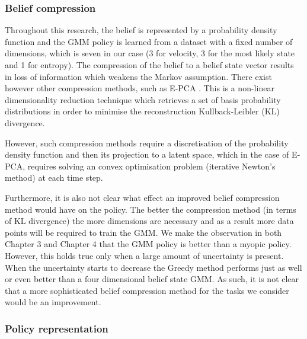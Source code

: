 \subsubsection{Belief compression}
%
%
%

Throughout this research, the belief is represented by a probability density function and the GMM policy
is learned from a dataset with a fixed number of dimensions, which is seven in our case (3 for velocity, 
3 for the most likely state and 1 for entropy). The compression of the belief to a belief state vector results 
in loss of information which weakens the Markov assumption. There exist however other compression methods, such 
as E-PCA \cite{NIPS2002_2319}. This is a non-linear dimensionality reduction technique which retrieves a set of basis probability 
distributions in order to minimise the reconstruction Kullback-Leibler (KL) divergence. 

However, such compression methods require a discretisation of the probability 
density function and then its projection to a latent space, which in the case of E-PCA, requires solving
an convex optimisation problem (iterative Newton's method) at each time step. 

Furthermore, it is also not clear what effect an improved belief compression method would have on the policy. The better 
the compression method (in terms of KL divergence) the more dimensions are necessary and as a result 
more data points will be required to train the GMM. We make the observation in both Chapter 3 and Chapter 4 that the 
GMM policy is better than a myopic policy. However, this holds true only when a large amount of uncertainty 
is present. When the uncertainty starts to decrease the Greedy method performs just as well or even better than a 
four dimensional belief state GMM. As such, it is not clear that a more sophisticated belief compression method for 
the tasks we consider would be an improvement.


\subsubsection{Policy representation}


